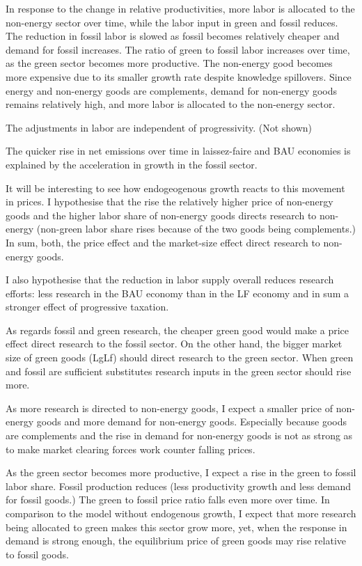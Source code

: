 \documentclass[12pt]{article}
\begin{document}
In response to the change in relative productivities, more labor is allocated to the non-energy sector over time, while the labor input in green and fossil reduces. The reduction in fossil labor is slowed as fossil becomes relatively cheaper and demand for fossil increases. The ratio of green to fossil labor increases over time, as the green sector becomes more productive. The non-energy good becomes more expensive due to its smaller growth rate despite knowledge spillovers. Since energy and non-energy goods are complements, demand for non-energy goods remains relatively high, and more labor is allocated to the non-energy sector. 

The adjustments in labor are independent of progressivity. (Not shown)

The quicker rise in net emissions over time in laissez-faire and BAU economies is explained by the acceleration in growth in the fossil sector.

It will be interesting to see how endogeogenous growth reacts to this movement in prices. I hypothesise that the rise the relatively higher price of non-energy goods and the higher labor share of non-energy goods directs research to non-energy (non-green labor share rises because of the two goods being complements.) In sum, both, the price effect and the market-size effect direct research to non-energy goods. 

I also hypothesise that the reduction in labor supply overall reduces research efforts: less research in the BAU economy than in the LF economy and in sum a stronger effect of progressive taxation. 

As regards fossil and green research, the cheaper green good would make a price effect direct research to the fossil sector. On the other hand, the bigger market size of green goods (LgLf) should direct research to the green sector. When green and fossil are sufficient substitutes research inputs in the green sector should rise more. 

As more research is directed to non-energy goods, I expect a smaller price of non-energy goods and more demand for non-energy goods. Especially because goods are complements and the rise in demand for non-energy goods is not as strong as to make market clearing forces work counter falling prices.

As the green sector becomes more productive, I expect a rise in the green to fossil labor share. Fossil production reduces (less productivity growth and less demand for fossil goods.) The green to fossil price ratio falls even more over time. In comparison to the model without endogenous growth, I expect that more research being allocated to green makes this sector grow more, yet, when the response in demand is strong enough, the equilibrium price of green goods may rise relative to fossil goods.
\end{document}
